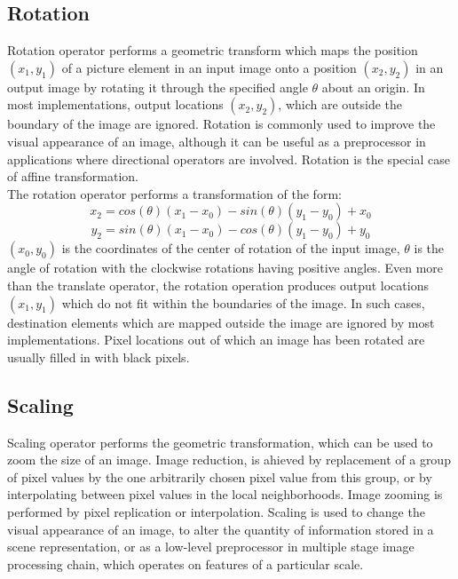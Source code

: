 \subsection{Rotation}
Rotation operator performs a geometric transform which maps the position $(x_{1},y_{1})$ of a picture element in an input image onto a position $(x_{2},y_{2})$ in an output image by rotating it through the specified angle $\theta$  about an origin. In most implementations, output locations $(x_{2},y_{2})$, which are outside the boundary of the image are ignored. Rotation is commonly used to improve the visual appearance of an image, although it can be useful as a preprocessor in applications where directional operators are involved. Rotation is the special case of affine transformation.\\

The rotation operator performs a transformation of the form:
\begin{displaymath}
x_{2}=cos\left ( \theta  \right )\left ( x_{1}-x_{0} \right )-sin\left ( \theta  \right )\left ( y_{1}-y_{0} \right )+x_{0}
\end{displaymath}
\begin{displaymath}
y_{2}=sin\left ( \theta  \right )\left ( x_{1}-x_{0} \right )-cos\left ( \theta  \right )\left ( y_{1}-y_{0} \right )+y_{0}
\end{displaymath}
$(x_{0},y_{0})$ is the coordinates of the center of rotation of the input image, $\theta$ is the angle of rotation with the clockwise rotations having positive angles. Even more than the translate operator, the rotation operation produces output locations $(x_{1},y_{1})$ which do not fit within the boundaries of the image. In such cases, destination elements which are mapped outside the image are ignored by most implementations. Pixel locations out of which an image has been rotated are usually filled in with black pixels.\\

\subsection{Scaling}
Scaling operator performs the geometric transformation, which can be used to zoom the size of an image. Image reduction, is ahieved by replacement of a group of pixel values by the one arbitrarily chosen pixel value from this group, or by interpolating between pixel values in the local neighborhoods. Image zooming is performed by pixel replication or interpolation. Scaling is used to change the visual appearance of an image, to alter the quantity of information stored in a scene representation, or as a low-level preprocessor in multiple stage image processing chain, which operates on features of a particular scale. \\

